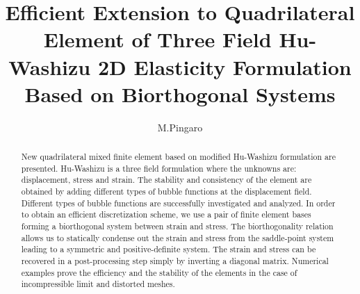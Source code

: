 \documentclass[preprint,12pt,authoryear]{elsarticle}
\begin{document}
\begin{frontmatter}




\title{Efficient Extension to Quadrilateral Element of Three 
Field Hu-Washizu 2D Elasticity Formulation Based on Biorthogonal Systems}

	


\author{M.Pingaro}

%


\begin{abstract}
New quadrilateral mixed finite element based on modified Hu-Washizu formulation are presented.
Hu-Washizu is a three field formulation where the unknowns are: displacement, stress and strain.
The stability and consistency of the element are obtained by adding different types of bubble functions at the displacement field. Different types of bubble functions are successfully investigated and analyzed. 
In order to obtain an efficient discretization scheme, we use a pair of finite element bases forming a biorthogonal system between strain and stress. 
The biorthogonality relation allows us to statically condense out the strain and stress from the saddle-point system leading to a symmetric and positive-definite system. 
The strain and stress can be recovered in a post-processing step simply by inverting a diagonal matrix.
Numerical examples prove the efficiency and the stability of the elements in the case of incompressible limit and distorted meshes.
\end{abstract}


\end{frontmatter}
\end{document}

